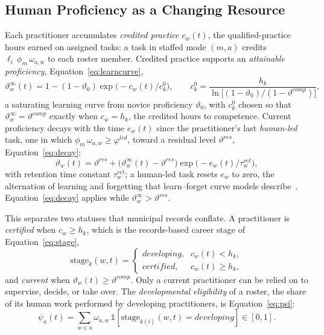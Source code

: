 \documentclass[utf8]{FrontiersinHarvard}
\begin{document}
	\subsection{Human Proficiency as a Changing Resource}
	\label{sec:proficiency}

	Each practitioner accumulates \textit{credited practice} $c_w(t)$, the qualified-practice hours earned on assigned tasks: a task in staffed mode $(m,a)$ credits $\ell_i\,\phi_m\,\omega_{a,w}$ to each roster member. Credited practice supports an \textit{attainable proficiency}, Equation~\eqref{eq:learncurve},
	\begin{equation}
		\vartheta^{\infty}_w(t) = 1 - (1-\vartheta_0)\exp\!\bigl(-c_w(t)/c^0_k\bigr),
		\qquad c^0_k = \frac{h_k}{\ln\bigl[(1-\vartheta_0)/(1-\vartheta^{comp})\bigr]},
		\label{eq:learncurve}
	\end{equation}
	a saturating learning curve from novice proficiency $\vartheta_0$, with $c^0_k$ chosen so that $\vartheta^{\infty}_w = \vartheta^{comp}$ exactly when $c_w = h_k$, the credited hours to competence. Current proficiency decays with the time $e_w(t)$ since the practitioner's last \textit{human-led} task, one in which $\phi_m\,\omega_{a,w}\ge\varphi^{led}$, toward a residual level $\vartheta^{res}$, Equation~\eqref{eq:decay}:
	\begin{equation}
		\vartheta_w(t) = \vartheta^{res} + \bigl(\vartheta^{\infty}_w(t) - \vartheta^{res}\bigr)\exp\!\bigl(-e_w(t)/\tau^{ret}_w\bigr),
		\label{eq:decay}
	\end{equation}
	with retention time constant $\tau^{ret}_w$; a human-led task resets $e_w$ to zero, the alternation of learning and forgetting that learn--forget curve models describe~\citep{JaberBonney1996}. Equation~\eqref{eq:decay} applies while $\vartheta^{\infty}_w>\vartheta^{res}$.

	This separates two statuses that municipal records conflate. A practitioner is \textit{certified} when $c_w\ge h_k$, which is the records-based career stage of Equation~\eqref{eq:stage},
	\begin{equation}
		\mathrm{stage}_k(w,t)=
		\begin{cases}
			\textit{developing}, & c_w(t) < h_k,\\
			\textit{certified}, & c_w(t) \geq h_k,
		\end{cases}
		\label{eq:stage}
	\end{equation}
	and \textit{current} when $\vartheta_w(t)\ge\vartheta^{comp}$. Only a current practitioner can be relied on to supervise, decide, or take over. The \textit{developmental eligibility} of a roster, the share of its human work performed by developing practitioners, is Equation~\eqref{eq:psi}:
	\begin{equation}
		\psi_a(t)=\sum_{w\in a}\omega_{a,w}\,\mathbb{1}\!\left[\mathrm{stage}_{k(i)}(w,t)=\textit{developing}\right] \in [0,1].
		\label{eq:psi}
	\end{equation}
\end{document}
